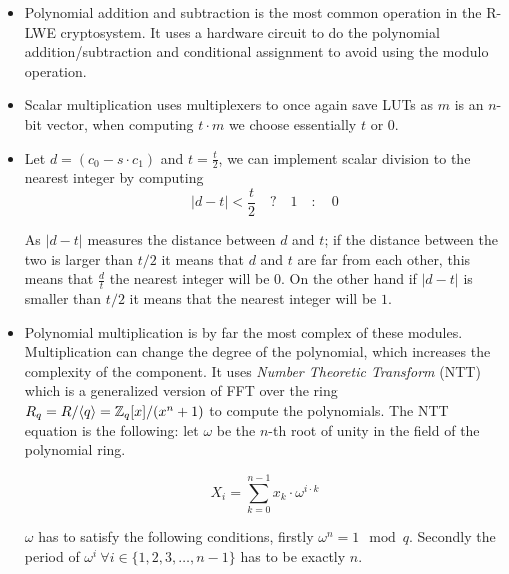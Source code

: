 \begin{itemize}

    \item
        Polynomial addition and subtraction is the most common operation in the
        R-LWE cryptosystem. It uses a hardware circuit to do the polynomial
        addition/subtraction and conditional assignment to avoid using the
        modulo operation.

    \item
        Scalar multiplication uses multiplexers to once again save LUTs as
        $m$ is an $n$-bit vector, when computing $t\cdot m$ we choose
        essentially $t$ or $0$.

    \item
        Let $d = (c_0 - s \cdot c_1)$ and $t = \frac{t}{2}$, we can implement
        scalar division to the nearest integer by computing
        \[|d - t| < \frac{t}{2} \quad ? \quad 1 \quad : \quad 0\]

        As $|d - t|$ measures the distance between $d$ and $t$; if the
        distance between the two is larger than $t / 2$ it means that $d$ and
        $t$ are far from each other, this means that $\frac{d}{t}$ the nearest
        integer will be $0$. On the other hand if $|d - t|$ is smaller than $t
        / 2$ it means that the nearest integer will be $1$.

    \item
        Polynomial multiplication is by far the most complex of these modules.
        Multiplication can change the degree of the polynomial, which increases
        the complexity of the component. It uses \textit{Number Theoretic
        Transform} (NTT) which is a generalized version of FFT over the ring
        $R_q = R / \langle q \rangle = \mathbb{Z}_q [x] / (x^n + 1)$ to compute the
        polynomials. The NTT equation is the following: let $\omega$ be the
        $n$-th root of unity in the field of the polynomial ring.

        \[ X_i = \sum^{n-1}_{k=0} x_k \cdot \omega^{i\cdot k} \]

        $\omega$ has to satisfy the following conditions, firstly
        $\omega^n = 1 \mod q$. Secondly the period of
        $\omega^i \ \forall i \in \{1, 2, 3, \ldots, n - 1\}$ has to be exactly
        $n$.

\end{itemize}


